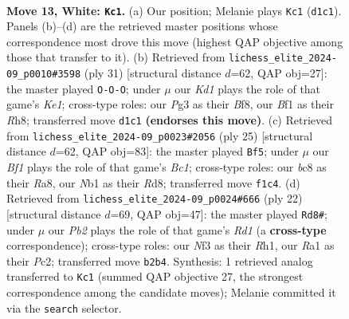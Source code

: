 \documentclass[11pt]{article}
\begin{document}
\clearpage

\begin{figure}[p]\centering
\begin{subfigure}{0.46\textwidth}\centering
\resizebox{\linewidth}{!}{%
\newchessgame
\chessboard[
  setfen={r1b1kb1r/1p3ppp/p1n1p3/4P3/n7/4BNP1/PP3P1P/RN1K1B1R w kq - 2 13},
  showmover=false,
  pgfstyle=straightmove, color=movearrow, markmove={d1-c1}
]}
\caption{}
\end{subfigure}\hfill
\begin{subfigure}{0.46\textwidth}\centering
\resizebox{\linewidth}{!}{%
\newchessgame
\chessboard[
  setfen={r3kb1r/5ppp/p3b3/np2p3/8/2P1N3/PP2BPPP/R1B1K2R b KQkq - 3 16},
  showmover=false,
  pgfstyle=straightmove, color=movearrow, markmove={e8-c8}
]}
\caption{}
\end{subfigure}
\\[4pt]
\begin{subfigure}{0.46\textwidth}\centering
\resizebox{\linewidth}{!}{%
\newchessgame
\chessboard[
  setfen={r1br2k1/pp2ppbp/2n3p1/4P1N1/4p3/2P3B1/PP3PPP/R3KB1R b KQ - 1 13},
  showmover=false,
  pgfstyle=straightmove, color=movearrow, markmove={c8-f5}
]}
\caption{}
\end{subfigure}\hfill
\begin{subfigure}{0.46\textwidth}\centering
\resizebox{\linewidth}{!}{%
\newchessgame
\chessboard[
  setfen={r1b1kb1r/5ppp/p1p1p3/4P1B1/6n1/2N5/PPP3PP/3RKB1R w Kkq - 1 12},
  showmover=false,
  pgfstyle=straightmove, color=movearrow, markmove={d1-d8}
]}
\caption{}
\end{subfigure}
\caption{\textbf{Move 13, White: \texttt{Kc1}.} (a) Our position; Melanie plays \texttt{Kc1} (\texttt{d1c1}). Panels (b)--(d) are the retrieved master positions whose correspondence most drove this move (highest QAP objective among those that transfer to it). (b) Retrieved from \texttt{lichess\_elite\_2024-09\_p0010\#3598} (ply 31) [structural distance $d$=62, QAP obj=27]: the master played \texttt{O-O-O}; under $\mu$ our \emph{Kd1} plays the role of that game's \emph{Ke1}; cross-type roles: our \emph{P}g3 as their \emph{B}f8, our \emph{B}f1 as their \emph{R}h8; transferred move \texttt{d1c1} \textbf{(endorses this move)}. (c) Retrieved from \texttt{lichess\_elite\_2024-09\_p0023\#2056} (ply 25) [structural distance $d$=62, QAP obj=83]: the master played \texttt{Bf5}; under $\mu$ our \emph{Bf1} plays the role of that game's \emph{Bc1}; cross-type roles: our \emph{b}c8 as their \emph{R}a8, our \emph{N}b1 as their \emph{R}d8; transferred move \texttt{f1c4}. (d) Retrieved from \texttt{lichess\_elite\_2024-09\_p0024\#666} (ply 22) [structural distance $d$=69, QAP obj=47]: the master played \texttt{Rd8\#}; under $\mu$ our \emph{Pb2} plays the role of that game's \emph{Rd1} (a \textbf{cross-type} correspondence); cross-type roles: our \emph{N}f3 as their \emph{R}h1, our \emph{R}a1 as their \emph{P}c2; transferred move \texttt{b2b4}. Synthesis: 1 retrieved analog transferred to \texttt{Kc1} (summed QAP objective 27, the strongest correspondence among the candidate moves); Melanie committed it via the \texttt{search} selector.}
\label{fig:thought-m24}
\end{figure}
\end{document}
